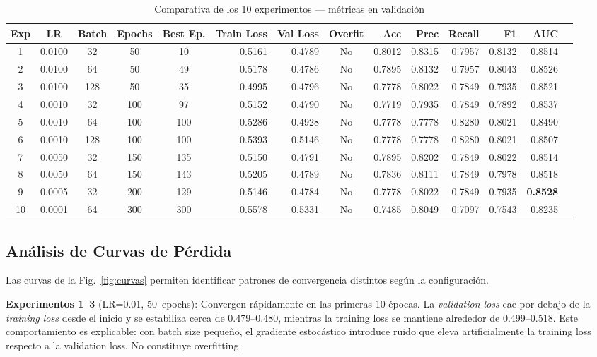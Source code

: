 \documentclass[conference]{IEEEtran}
\begin{document}
\begin{table}[t]
\caption{Comparativa de los 10 experimentos --- m\'{e}tricas en validaci\'{o}n}
\label{tab:resultados}
\centering
\begin{tabular}{cccccrrcrrrrrr}
\toprule
\textbf{Exp} & \textbf{LR} & \textbf{Batch} & \textbf{Epochs} & \textbf{Best Ep.}
  & \textbf{Train Loss} & \textbf{Val Loss} & \textbf{Overfit}
  & \textbf{Acc} & \textbf{Prec} & \textbf{Recall} & \textbf{F1} & \textbf{AUC} \\
\midrule
1  & 0.0100 & 32  & 50  & 10  & 0.5161 & 0.4789 & No & 0.8012 & 0.8315 & 0.7957 & 0.8132 & 0.8514 \\
2  & 0.0100 & 64  & 50  & 49  & 0.5178 & 0.4786 & No & 0.7895 & 0.8132 & 0.7957 & 0.8043 & 0.8526 \\
3  & 0.0100 & 128 & 50  & 35  & 0.4995 & 0.4796 & No & 0.7778 & 0.8022 & 0.7849 & 0.7935 & 0.8521 \\
4  & 0.0010 & 32  & 100 & 97  & 0.5152 & 0.4790 & No & 0.7719 & 0.7935 & 0.7849 & 0.7892 & 0.8537 \\
5  & 0.0010 & 64  & 100 & 100 & 0.5286 & 0.4928 & No & 0.7778 & 0.7778 & 0.8280 & 0.8021 & 0.8490 \\
6  & 0.0010 & 128 & 100 & 100 & 0.5393 & 0.5146 & No & 0.7778 & 0.7778 & 0.8280 & 0.8021 & 0.8507 \\
7  & 0.0050 & 32  & 150 & 135 & 0.5150 & 0.4791 & No & 0.7895 & 0.8202 & 0.7849 & 0.8022 & 0.8514 \\
8  & 0.0050 & 64  & 150 & 143 & 0.5205 & 0.4789 & No & 0.7836 & 0.8111 & 0.7849 & 0.7978 & 0.8518 \\
\rowcolor{gray!20}
9  & 0.0005 & 32  & 200 & 129 & 0.5146 & 0.4784 & No & 0.7778 & 0.8022 & 0.7849 & 0.7935 & \textbf{0.8528} \\
10 & 0.0001 & 64  & 300 & 300 & 0.5578 & 0.5331 & No & 0.7485 & 0.8049 & 0.7097 & 0.7543 & 0.8235 \\
\bottomrule
\end{tabular}
\end{table}

\subsection{An\'{a}lisis de Curvas de P\'{e}rdida}

Las curvas de la Fig.~\ref{fig:curvas} permiten identificar patrones de convergencia distintos seg\'{u}n la configuraci\'{o}n.

\textbf{Experimentos 1--3} (LR=0.01, 50~epochs): Convergen r\'{a}pidamente en las primeras 10 \'{e}pocas. La \textit{validation loss} cae por debajo de la \textit{training loss} desde el inicio y se estabiliza cerca de 0.479--0.480, mientras la training loss se mantiene alrededor de 0.499--0.518. Este comportamiento es explicable: con batch size peque\~{n}o, el gradiente estoc\'{a}stico introduce ruido que eleva artificialmente la training loss respecto a la validation loss. No constituye overfitting.
\end{document}
